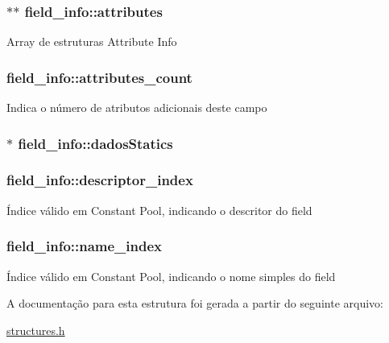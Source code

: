 \subsubsection[{\texorpdfstring{attributes}{attributes}}]{$\ast$$\ast$ field\+\_\+info\+::attributes}\hypertarget{structfield__info_a754de0f0fd6e62c413cca2979ca5debd}{}\label{structfield__info_a754de0f0fd6e62c413cca2979ca5debd}
Array de estruturas Attribute Info 
\subsubsection[{\texorpdfstring{attributes\+\_\+count}{attributes_count}}]{ field\+\_\+info\+::attributes\+\_\+count}\hypertarget{structfield__info_a83bfa4ff84a608e3dbd1c3968ebe1b80}{}\label{structfield__info_a83bfa4ff84a608e3dbd1c3968ebe1b80}
Indica o número de atributos adicionais deste campo 
\subsubsection[{\texorpdfstring{dados\+Statics}{dadosStatics}}]{$\ast$ field\+\_\+info\+::dados\+Statics}\hypertarget{structfield__info_aef0cb22b05664f3e93c74afa289fe865}{}\label{structfield__info_aef0cb22b05664f3e93c74afa289fe865}
\subsubsection[{\texorpdfstring{descriptor\+\_\+index}{descriptor_index}}]{ field\+\_\+info\+::descriptor\+\_\+index}\hypertarget{structfield__info_a12dd492b7fb1d61da1ac14938d97b07f}{}\label{structfield__info_a12dd492b7fb1d61da1ac14938d97b07f}
Índice válido em Constant Pool, indicando o descritor do field 
\subsubsection[{\texorpdfstring{name\+\_\+index}{name_index}}]{ field\+\_\+info\+::name\+\_\+index}\hypertarget{structfield__info_a425e3ae85badd81c67ef00acca85ad9e}{}\label{structfield__info_a425e3ae85badd81c67ef00acca85ad9e}
Índice válido em Constant Pool, indicando o nome simples do field 

A documentação para esta estrutura foi gerada a partir do seguinte arquivo\+:\begin{DoxyCompactItemize}
\item 
\hyperlink{structures_8h}{structures.\+h}\end{DoxyCompactItemize}
